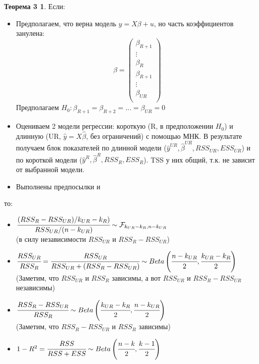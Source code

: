 \documentclass[12pt]{article} %
\theoremstyle{definition} %
\def \hb{\hat{\beta}}
\def \hy{\hat{y}}
\def \cF{\mathcal{F}}
\begin{document}
\newtheorem*{theo_nnn}{Теорема 3}
\begin{theo_nnn}
    Если:
    \begin{itemize}
        \item \text{[ТГМ1''] } Предполагаем, что верна модель
        $y = X\beta + u$, но часть коэффициентов занулена:
        \[
            \beta =
                \begin{pmatrix}
                    \beta_{R+1}  \\ \vdots \\ \beta_{R} \\
                    \beta_{R+1}  \\ \vdots \\ \beta_{UR} \\
                \end{pmatrix}
        \]
        Предполагаем $H_0: \beta_{R+1} = \beta_{R+2} =...=\beta_{UR}=0$
        \item \text{[ТГМ2''] } Оцениваем 2 модели регрессии: короткую (R, в предположении $H_0$) и длинную (UR, $\hy = X\hb$, без ограничений) с помощью МНК. В результате получаем блок показателей по длинной модели ($\hy^{UR}, \hb^{UR}, RSS_{UR}, ESS_{UR}$) и по короткой модели ($\hy^{R}, \hb^{R}, RSS_{R}, ESS_{R}$). TSS у них общий, т.к. не зависит от выбранной модели.
        \item Выполнены предпосылки \text{[ТГМ3-5] } и \text{[нормальность] }
    \end{itemize}

    то:
    \begin{itemize}
        \item $\cfrac{(RSS_{R} - RSS_{UR})/k_{UR} - k_{R})}{RSS_{UR}/(n-k_{UR})} \sim \cF_{k_{UR} - k_{R}, n-k_{UR}}$ \\
        (в силу независимости $RSS_{UR} \text{ и } RSS_{R} - RSS_{UR}$)
        \item $\cfrac{RSS_{UR}}{RSS_{R}} = \cfrac{RSS_{UR}}{RSS_{UR}+(RSS_{R}-RSS_{UR})} \sim Beta\left(\cfrac{n-k_{UR}}{2}, \cfrac{k_{UR} - k_{R}}{2}\right)$ \\
        (Заметим, что $RSS_{UR} \text{ и } RSS_{R}$ зависимы, а вот $RSS_{UR} \text{ и } RSS_{R}-RSS_{UR}$ независимы)
        \item $\cfrac{RSS_{R}-RSS_{UR}}{RSS_{R}} \sim Beta\left(\cfrac{k_{UR} - k_{R}}{2}, \cfrac{n-k_{UR}}{2}\right)$ \\
        (Заметим, что $RSS_{R}-RSS_{UR} \text{ и } RSS_{R}$ зависимы)
        \item $1-R^2 = \cfrac{RSS}{RSS+ESS} \sim Beta\left(\cfrac{n-k}{2}, \cfrac{k-1}{2}\right)$
    \end{itemize}


\end{theo_nnn}
\end{document}
